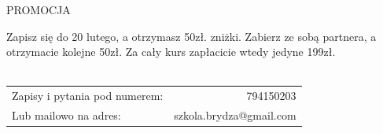 \documentclass{article}
\begin{document}
\vspace{20px}
\centerline{\Large{PROMOCJA}}
\vspace{10px}

Zapisz się do 20 lutego, a otrzymasz 50zł. zniżki. Zabierz ze sobą partnera, a otrzymacie kolejne 50zł. Za cały kurs
zapłacicie wtedy jedyne 199zł.\\\\
\begin{tabularx}{\textwidth}{X r}
	Zapisy i pytania pod numerem: & 794150203\\
	Lub mailowo na adres: & szkola.brydza@gmail.com\\
\end{tabularx}
\end{document}
